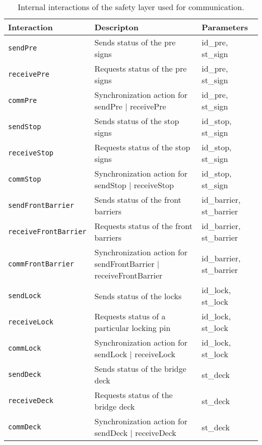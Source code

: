 \begin{table}[htb]%
\begin{tabular}{lll}
			\textbf{Interaction} &	\textbf{Descripton}	&	\textbf{Parameters}\\
      \hline
      
      \texttt{sendPre} & Sends status of the pre signs & id\_pre, st\_sign\\
      \texttt{receivePre} & Requests status of the pre signs & id\_pre, st\_sign\\
      \texttt{commPre} & Synchronization action for sendPre $\mid$ receivePre & id\_pre, st\_sign\\
      
      \texttt{sendStop} & Sends status of the stop signs & id\_stop, st\_sign\\
      \texttt{receiveStop} & Requests status of the stop signs & id\_stop, st\_sign\\
      \texttt{commStop} & Synchronization action for sendStop $\mid$ receiveStop & id\_stop, st\_sign\\
      
      \texttt{sendFrontBarrier} & Sends status of the front barriers & id\_barrier, st\_barrier\\
      \texttt{receiveFrontBarrier} & Requests status of the front barriers & id\_barrier, st\_barrier\\
      \texttt{commFrontBarrier} & Synchronization action for sendFrontBarrier $\mid$ receiveFrontBarrier & id\_barrier, st\_barrier\\
      
      \texttt{sendLock} & Sends status of the locks & id\_lock, st\_lock\\
      \texttt{receiveLock} & Requests status of a particular locking pin & id\_lock, st\_lock\\
      \texttt{commLock} & Synchronization action for sendLock $\mid$ receiveLock & id\_lock, st\_lock\\
      
      \texttt{sendDeck} & Sends status of the bridge deck & st\_deck\\
      \texttt{receiveDeck} & Requests status of the bridge deck & st\_deck\\
      \texttt{commDeck} & Synchronization action for sendDeck $\mid$ receiveDeck & st\_deck\\
\end{tabular}
\caption{Internal interactions of the safety layer used for communication.}
\label{tab:process}
\end{table}
